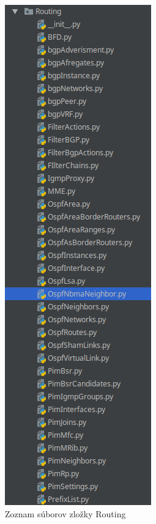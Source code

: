 \begin{figure}[H]
\centering
\includegraphics[scale=0.5]{../text/routing.png}
\caption{Zoznam súborov zložky Routing}
\label{fig:routing}
\end{figure}
